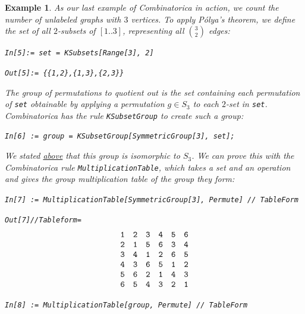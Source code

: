 \documentclass[12pt]{article}
\theoremstyle{plain}
\newtheorem{exa}{Example}
\newcommand{\codefont}[1]{{\fontshape{n}\texttt{#1}}}
\newenvironment{snippet}{\vspace{10px}\fontfamily{ppl}\selectfont}{\vspace{10px}}
\begin{document}
\begin{exa}
As our last example of Combinatorica in action, we count the number of unlabeled graphs with \( 3 \) vertices.
To apply P\'olya's theorem,
we define the set of all \(2\)-subsets of \( [1..3] \), representing all \( \binom{3}{2} \) edges:

\begin{snippet}
\codefont{In[5]:= set = KSubsets[Range[3], 2]}

\codefont{Out[5]:= \{\{1,2\},\{1,3\},\{2,3\}\} }
\end{snippet}

The group of permutations to quotient out is the set containing each permutation of \codefont{set} obtainable by applying a permutation \( g \in S_3 \) to each \(2\)-set in \codefont{set}.
Combinatorica has the rule \codefont{KSubsetGroup} to create such a group:

\begin{snippet}
\codefont{In[6] := group = KSubsetGroup[SymmetricGroup[3], set];}
\end{snippet}

We stated \hyperref[exa:graphs]{above} that this group is isomorphic to \( S_3 \).
We can prove this with the Combinatorica rule \codefont{MultiplicationTable}, which takes a set and an operation and gives the group multiplication table of the group they form:

\begin{snippet}
\codefont{In[7] := MultiplicationTable[SymmetricGroup[3], Permute] // TableForm}

\codefont{Out[7]//Tableform=}
\[
\begin{array}{llllll}
 \codefont{1} & \codefont{2} & \codefont{3} & \codefont{4} & \codefont{5} & \codefont{6} \\
 \codefont{2} & \codefont{1} & \codefont{5} & \codefont{6} & \codefont{3} & \codefont{4} \\
 \codefont{3} & \codefont{4} & \codefont{1} & \codefont{2} & \codefont{6} & \codefont{5} \\
 \codefont{4} & \codefont{3} & \codefont{6} & \codefont{5} & \codefont{1} & \codefont{2} \\
 \codefont{5} & \codefont{6} & \codefont{2} & \codefont{1} & \codefont{4} & \codefont{3} \\
 \codefont{6} & \codefont{5} & \codefont{4} & \codefont{3} & \codefont{2} & \codefont{1}
\end{array}
\]

\codefont{In[8] := MultiplicationTable[group, Permute] // TableForm}


\end{snippet}
\end{exa}
\end{document}
